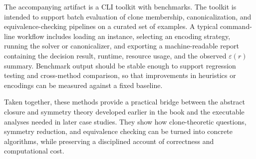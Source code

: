 The accompanying artifact is a CLI toolkit with benchmarks. The toolkit is intended to support batch evaluation of clone membership, canonicalization, and equivalence-checking pipelines on a curated set of examples. A typical command-line workflow includes loading an instance, selecting an encoding strategy, running the solver or canonicalizer, and exporting a machine-readable report containing the decision result, runtime, resource usage, and the observed \(\varepsilon(r)\) summary. Benchmark output should be stable enough to support regression testing and cross-method comparison, so that improvements in heuristics or encodings can be measured against a fixed baseline.

Taken together, these methods provide a practical bridge between the abstract closure and symmetry theory developed earlier in the book and the executable analyses needed in later case studies. They show how clone-theoretic questions, symmetry reduction, and equivalence checking can be turned into concrete algorithms, while preserving a disciplined account of correctness and computational cost.
